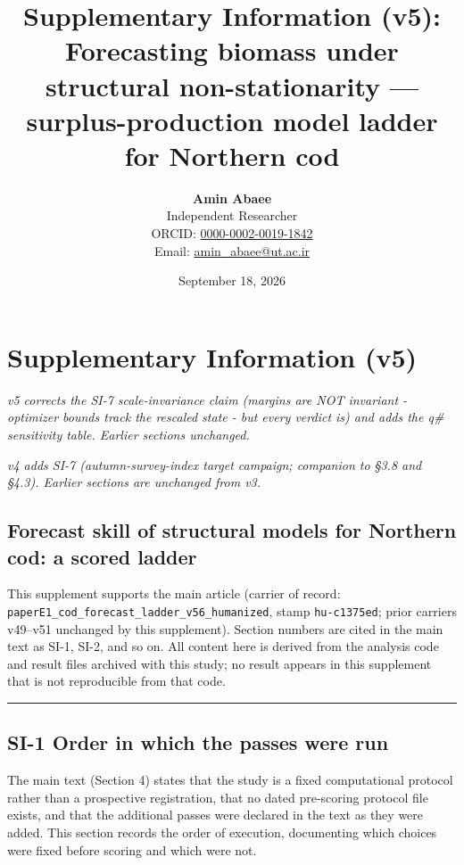 \documentclass[11pt]{article}
\title{Supplementary Information (v5): Forecasting biomass under structural non-stationarity — surplus-production model ladder for Northern cod}
\author{\textbf{Amin Abaee}\\ Independent Researcher\\[2pt] ORCID: \href{https://orcid.org/0000-0002-0019-1842}{0000-0002-0019-1842}\\ Email: \href{mailto:amin_abaee@ut.ac.ir}{amin_abaee@ut.ac.ir}}
\date{September 18, 2026}
\begin{document}
\maketitle

\section{Supplementary Information
(v5)}\label{supplementary-information-v5}

\emph{v5 corrects the SI-7 scale-invariance claim (margins are NOT
invariant - optimizer bounds track the rescaled state - but every
verdict is) and adds the q\# sensitivity table. Earlier sections
unchanged.}

\emph{v4 adds SI-7 (autumn-survey-index target campaign; companion to
§3.8 and §4.3). Earlier sections are unchanged from v3.}

\subsection{Forecast skill of structural models for Northern cod: a
scored
ladder}\label{forecast-skill-of-structural-models-for-northern-cod-a-scored-ladder}

This supplement supports the main article (carrier of record:
\texttt{paperE1\_cod\_forecast\_ladder\_v56\_humanized}, stamp
\texttt{hu-c1375ed}; prior carriers v49--v51 unchanged by this
supplement). Section numbers are cited in the main text as SI-1, SI-2,
and so on. All content here is derived from the analysis code and result
files archived with this study; no result appears in this supplement
that is not reproducible from that code.

\begin{center}\rule{0.5\linewidth}{0.5pt}\end{center}

\subsection{SI-1 Order in which the passes were
run}\label{si-1-order-in-which-the-passes-were-run}

The main text (Section 4) states that the study is a fixed computational
protocol rather than a prospective registration, that no dated
pre-scoring protocol file exists, and that the additional passes were
declared in the text as they were added. This section records the order
of execution, documenting which choices were fixed before scoring and
which were not.
\end{document}
